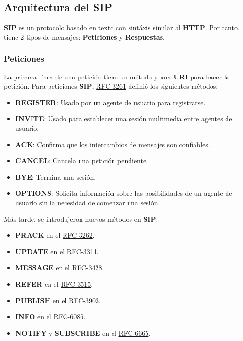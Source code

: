 \documentclass[a4paper, 11pt]{article} %
\newcommand{\RFC}[1]{\href{https://www.ietf.org/rfc/rfc#1.txt}{RFC-#1}}
\begin{document}
	\subsection{Arquitectura del SIP}
	\textbf{SIP} es un protocolo basado en texto con sintáxis similar al \textbf{HTTP}. Por tanto, tiene 2 tipos de mensajes: \textbf{Peticiones} y \textbf{Respuestas}.
		
		\subsubsection{Peticiones}
		La primera línea de una petición tiene un método y una \textbf{URI} para hacer la petición. Para peticiones \textbf{SIP}, \RFC{3261} definió los siguientes métodos:
		\begin{itemize}
			\item \textbf{REGISTER}: Usado por un agente de usuario para registrarse.
			\item \textbf{INVITE}: Usado para establecer una sesión multimedia entre agentes de usuario.
			\item \textbf{ACK}: Confirma que los intercambios de mensajes son confiables.
			\item \textbf{CANCEL}: Cancela una petición pendiente.
			\item \textbf{BYE}: Termina una sesión.
			\item \textbf{OPTIONS}: Solicita información sobre las posibilidades de un agente de usuario sin la necesidad de comenzar una sesión.
		\end{itemize}
		Más tarde, se introdujeron nuevos métodos en \textbf{SIP}:
		\begin{itemize}
			\item \textbf{PRACK} en el \RFC{3262}.
			\item \textbf{UPDATE} en el \RFC{3311}.
			\item \textbf{MESSAGE} en el \RFC{3428}.
			\item \textbf{REFER} en el \RFC{3515}.
			\item \textbf{PUBLISH} en el \RFC{3903}.
			\item \textbf{INFO} en el \RFC{6086}.
			\item \textbf{NOTIFY} y \textbf{SUBSCRIBE} en el \RFC{6665}.
		\end{itemize}
		
\end{document}
